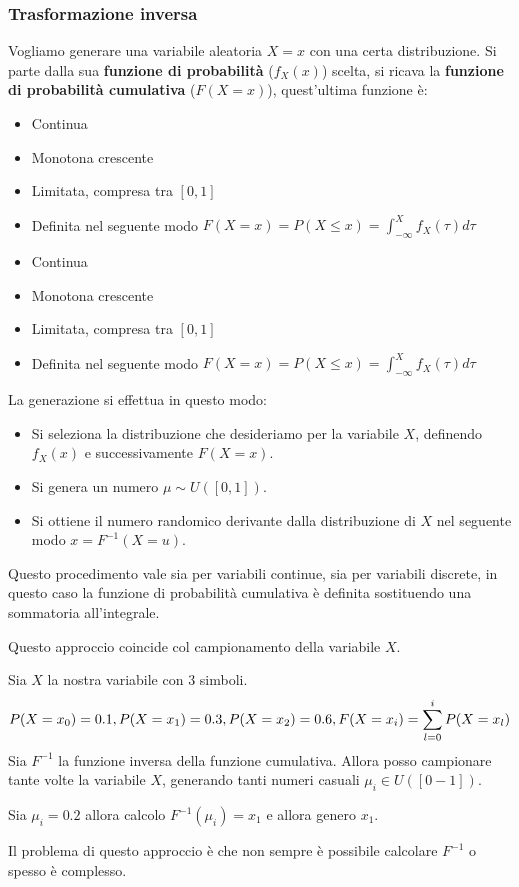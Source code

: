 \subsubsection{Trasformazione inversa}
Vogliamo generare una variabile aleatoria $X = x$ con una certa distribuzione.
Si parte dalla sua \textbf{funzione di probabilità} ($f_X(x)$) scelta, si ricava
la \textbf{funzione di probabilità cumulativa} ($F(X = x)$), quest'ultima funzione è:
\begin{itemize}
    \item Continua
    \item Monotona crescente
    \item Limitata, compresa tra $[0,1]$
    \item Definita nel seguente modo $F(X=x) =P(X \leq x) = \int_{-\infty}^X f_X(\tau) d\tau$
    \item Continua
    \item Monotona crescente
    \item Limitata, compresa tra $[0,1]$
    \item Definita nel seguente modo $F(X=x) =P(X \leq x) = \int_{-\infty}^X f_X(\tau) d\tau$
\end{itemize}
La generazione si effettua in questo modo:
\begin{itemize}
    \item Si seleziona la distribuzione che desideriamo per la variabile $X$,
          definendo $f_X(x)$ e successivamente $F(X=x)$.
    \item Si genera un numero $\mu \sim U([0,1])$.
    \item Si ottiene il numero randomico derivante dalla distribuzione di $X$
          nel seguente modo $x = F^{-1}(X=u)$.
\end{itemize}
Questo procedimento vale sia per variabili continue, sia per variabili discrete,
in questo caso la funzione di probabilità cumulativa è definita sostituendo una
sommatoria all'integrale.

Questo approccio coincide col campionamento della variabile $X$.
\begin{esempio}
    Sia $X$ la nostra variabile con $3$ simboli.
    \begin{equation*}
        P(X = x_0) = 0.1, \space P(X = x_1) = 0.3, \space P(X = x_2) = 0.6,
        F(X = x_i) = \sum_{l=0}^{i} P(X = x_l)
    \end{equation*}
    Sia $F^{-1}$ la funzione inversa della funzione cumulativa. Allora posso
    campionare tante volte la variabile $X$, generando tanti numeri casuali
    $\mu_i \in U([0-1])$.

    Sia $\mu_i = 0.2$ allora calcolo $F^{-1}(\mu_i) = x_1$ e allora genero $x_1$.
\end{esempio}
Il problema di questo approccio è che non sempre è possibile calcolare $F^{-1}$ o
spesso è complesso.
